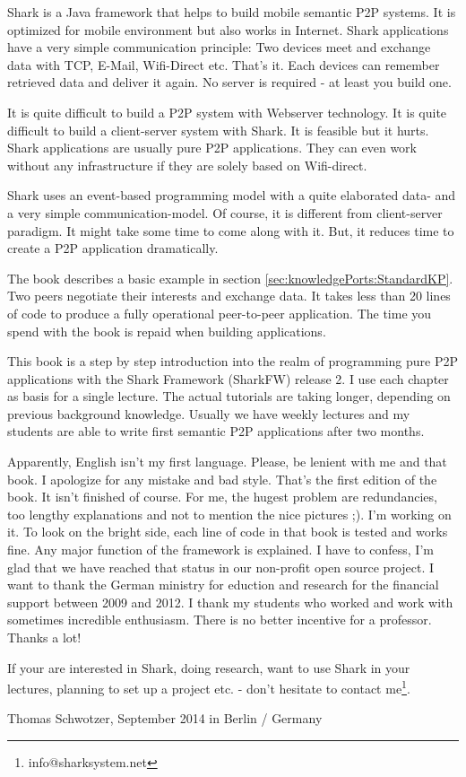 Shark is a Java framework that helps to build mobile semantic P2P systems. It is optimized for mobile environment but also works in Internet. Shark applications have a very simple communication principle: Two devices meet and exchange data with TCP, E-Mail, Wifi-Direct etc. That's it. Each devices can remember retrieved data and deliver it again. No server is required - at least you build one. 

It is quite difficult to build a P2P system with Webserver technology. It is quite difficult to build a client-server system with Shark. It is feasible but it hurts. Shark applications are usually pure P2P applications. They can even work without any infrastructure if they are solely based on Wifi-direct.

Shark uses an event-based programming model with a quite elaborated data- and a very simple communication-model. Of course, it is different from client-server paradigm. It might take some time to come along with it. But, it reduces time to create a P2P application dramatically. 

The book describes a basic example in section \ref{sec:knowledgePorts:StandardKP}. Two peers negotiate their interests and exchange data. It takes less than 20 lines of code to produce a fully operational peer-to-peer application. The time you spend with the book is repaid when building applications.

This book is a step by step introduction into the realm of programming pure 
P2P applications with the Shark Framework (SharkFW) release 2. I use each 
chapter as basis for a single lecture. The actual tutorials are taking longer, depending on previous background knowledge. Usually we have weekly lectures and my students are able to write first semantic P2P applications after two months.

Apparently, English isn't my first language. Please, be lenient with me and that book. I apologize for any mistake and bad style. That's the first edition of the book. It isn't finished of course. For me, the hugest problem are redundancies, too lengthy explanations and not to mention the nice pictures ;). I'm working on it. To look on the bright side, each line of code in that book is tested and works fine. Any major function of the framework is explained. I have to confess, I'm glad that we have reached that status in our non-profit open source project.
I want to thank the German ministry for eduction and research for the financial support between 2009 and 2012. I thank my students who worked and work with sometimes incredible enthusiasm. There is no better incentive for a professor. Thanks a lot!

If your are interested in Shark, doing research, want to use Shark in your lectures, planning to set up a project etc. - don't hesitate to contact me\footnote{info@sharksystem.net}.

\vspace{1,5cm}

Thomas Schwotzer, September 2014 in Berlin / Germany
